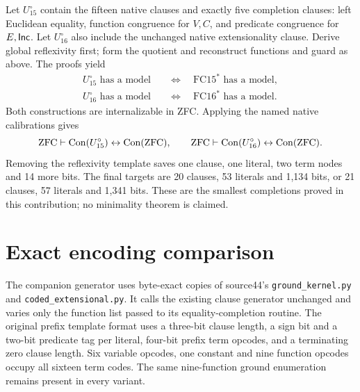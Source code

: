Let $U_{15}^{\circ}$ contain the fifteen native clauses and exactly five
completion clauses: left Euclidean equality, function congruence for
$V,C$, and predicate congruence for $E,\mathsf{Inc}$. Let $U_{16}^{\circ}$
also include the unchanged native extensionality clause. Derive global
reflexivity first; form the quotient and reconstruct functions and guard
as above. The proofs yield
\[
\begin{split}
U_{15}^{\circ}\text{ has a model}
  &\quad\Longleftrightarrow\quad\mathrm{FC15}^*\text{ has a model},\\
U_{16}^{\circ}\text{ has a model}
  &\quad\Longleftrightarrow\quad\mathrm{FC16}^*\text{ has a model}.
\end{split}
\]
Both constructions are internalizable in ZFC. Applying the named native
calibrations gives
\[
\mathrm{ZFC}\vdash
\operatorname{Con}(U_{15}^{\circ})\leftrightarrow\operatorname{Con}(\mathrm{ZFC}),
\qquad
\mathrm{ZFC}\vdash
\operatorname{Con}(U_{16}^{\circ})\leftrightarrow\operatorname{Con}(\mathrm{ZFC}).
\]
Removing the reflexivity template saves one clause, one literal, two
term nodes and 14 more bits. The final targets are 20 clauses, 53
literals and 1,134 bits, or 21 clauses, 57 literals and 1,341 bits.
These are the smallest completions proved in this contribution; no
minimality theorem is claimed.

\section{Exact encoding comparison}

The companion generator uses byte-exact copies of source44's
\texttt{ground\_kernel.py} and \texttt{coded\_extensional.py}. It calls the
existing clause generator unchanged and varies only the function list
passed to its equality-completion routine. The original prefix template
format uses a three-bit clause length, a sign bit and a two-bit predicate
tag per literal, four-bit prefix term opcodes, and a terminating zero
clause length. Six variable opcodes, one constant and nine function
opcodes occupy all sixteen term codes. The same nine-function ground
enumeration remains present in every variant.


